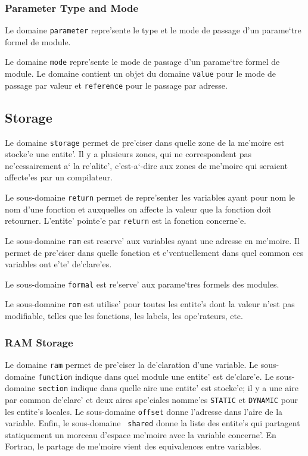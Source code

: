 \subsubsection{Parameter Type and Mode}
\label{subsubsection-parameter}

{
Le domaine \verb/parameter/ repre'sente le type et le mode de passage d'un
parame`tre formel de module. 
}

{
Le domaine \verb/mode/ repre'sente le mode de passage d'un parame`tre
formel de module. Le domaine contient un objet du domaine \verb/value/
pour le mode de passage par valeur et \verb/reference/ pour le passage
par adresse.
}

\subsection{Storage}
\label{subsection-storage}

{
Le domaine \verb/storage/ permet de pre'ciser dans quelle zone de la
me'moire est stocke'e une entite'. Il y a plusieurs zones, qui ne
correspondent pas ne'cessairement a` la re'alite', c'est-a`-dire aux
zones de me'moire qui seraient affecte'es par un compilateur.

Le sous-domaine \verb/return/ permet de repre'senter les variables ayant
pour nom le nom d'une fonction et auxquelles on affecte la valeur que la
fonction doit retourner. L'entite' pointe'e par \verb/return/ est la
fonction concerne'e.

Le sous-domaine \verb/ram/ est reserve' aux variables ayant une adresse
en me'moire. Il permet de pre'ciser dans quelle fonction et
e'ventuellement dans quel common ces variables ont e'te' de'clare'es.

Le sous-domaine \verb/formal/ est re'serve' aux parame`tres formels des
modules.

Le sous-domaine \verb/rom/ est utilise' pour toutes les entite's dont la
valeur n'est pas modifiable, telles que les fonctions, les labels, les
ope'rateurs, etc.
}

\subsubsection{RAM Storage}
\label{subsubsection-ram}

{
Le domaine \verb/ram/ permet de pre'ciser la de'claration d'une
variable. Le sous-domaine \verb/function/ indique dans quel module une
entite' est de'clare'e. Le sous-domaine \verb/section/ indique dans
quelle aire une entite' est stocke'e; il y a une aire par common
de'clare' et deux aires spe'ciales nomme'es \verb/STATIC/ et
\verb/DYNAMIC/ pour les entite's locales. Le sous-domaine \verb/offset/
donne l'adresse dans l'aire de la variable. Enfin, le sous-domaine {\tt
shared} donne la liste des entite's qui partagent statiquement un
morceau d'espace me'moire avec la variable concerne'. En Fortran, le
partage de me'moire vient des equivalences entre variables.  }

